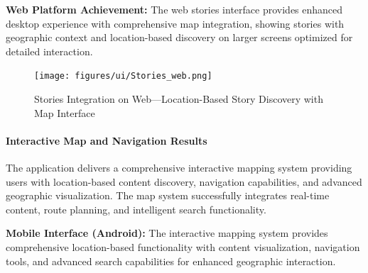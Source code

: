 \textbf{Web Platform Achievement:}
The web stories interface provides enhanced desktop experience with comprehensive map integration, showing stories with geographic context and location-based discovery on larger screens optimized for detailed interaction.

\begin{figure}[!htbp]
    \centering
    \texttt{[image: figures/ui/Stories\_web.png]}
    \caption{Stories Integration on Web---Location-Based Story Discovery with Map Interface}\label{fig:web_stories}
\end{figure}

\clearpage

\paragraph{Interactive Map and Navigation Results}
The application delivers a comprehensive interactive mapping system providing users with location-based content discovery, navigation capabilities, and advanced geographic visualization. The map system successfully integrates real-time content, route planning, and intelligent search functionality.

\textbf{Mobile Interface (Android):}
The interactive mapping system provides comprehensive location-based functionality with content visualization, navigation tools, and advanced search capabilities for enhanced geographic interaction.

